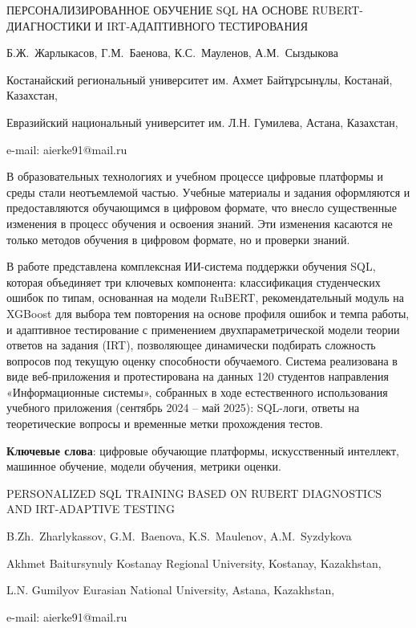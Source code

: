 \begin{header}
ПЕРСОНАЛИЗИРОВАННОЕ ОБУЧЕНИЕ SQL НА ОСНОВЕ RUBERT-ДИАГНОСТИКИ И IRT-АДАПТИВНОГО ТЕСТИРОВАНИЯ

Б.Ж.~Жарлыкасов,
Г.М.~Баенова,
К.С.~Мауленов,
А.М.~Сыздыкова\envelope
\end{header}

\begin{affil}
Костанайский региональный университет им. Ахмет Байтұрсынұлы, Костанай, Казахстан,

Евразийский национальный университет им. Л.Н. Гумилева, Астана, Казахстан,

e-mail: aierke91@mail.ru
\end{affil}

В образовательных технологиях и учебном процессе цифровые платформы и
среды стали неотъемлемой частью. Учебные материалы и задания оформляются
и предоставляются обучающимся в цифровом формате, что внесло
существенные изменения в процесс обучения и освоения знаний. Эти
изменения касаются не только методов обучения в цифровом формате, но и
проверки знаний.

В работе представлена комплексная ИИ-система поддержки обучения SQL,
которая объединяет три ключевых компонента: классификация студенческих
ошибок по типам, основанная на модели RuBERT, рекомендательный модуль на
XGBoost для выбора тем повторения на основе профиля ошибок и темпа
работы, и адаптивное тестирование с применением двухпараметрической
модели теории ответов на задания (IRT), позволяющее динамически
подбирать сложность вопросов под текущую оценку способности обучаемого.
Система реализована в виде веб-приложения и протестирована на данных 120
студентов направления «Информационные системы», собранных в ходе
естественного использования учебного приложения (сентябрь 2024 -- май
2025): SQL-логи, ответы на теоретические вопросы и временные метки
прохождения тестов.

{\bfseries Ключевые слова}: цифровые обучающие платформы, искусственный
интеллект, машинное обучение, модели обучения, метрики оценки.

\begin{header}
PERSONALIZED SQL TRAINING BASED ON RUBERT DIAGNOSTICS AND IRT-ADAPTIVE TESTING

B.Zh.~Zharlykassov,
G.M.~Baenova,
K.S.~Maulenov,
A.M.~Syzdykova\envelope
\end{header}

\begin{affil}
Akhmet Baitursynuly Kostanay Regional University, Kostanay, Kazakhstan,

L.N. Gumilyov Eurasian National University, Astana, Kazakhstan,

e-mail: aierke91@mail.ru
\end{affil}

